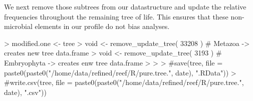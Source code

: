 \documentclass{article}
\begin{document}
We next remove those subtrees from our datastructure and update the relative frequencies throughout the
remaining tree of life.
This ensures that these non-microbial elements in our profile do not bias analyses.

\begin{Schunk}
\begin{Sinput}
> modified.one <- tree
> void <- remove_update_tree( 33208 )  # Metazoa   -> creates new tree data.frame
> void <- remove_update_tree( 3193 )  # Embryophyta -> creates enw tree data.frame
> 
> 
> #save(tree, file = paste0(paste0("/home/data/refined/reef/R/pure.tree.", date), ".RData"))
> #write.csv(tree, file = paste0(paste0("/home/data/refined/reef/R/pure.tree.", date), ".csv"))
\end{Sinput}
\end{Schunk}
\end{document}
